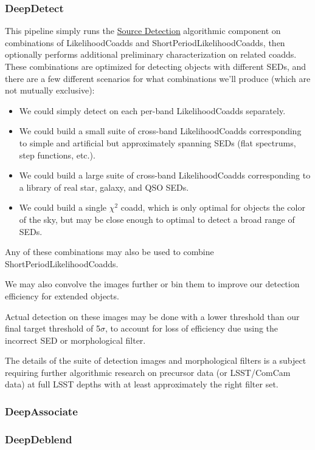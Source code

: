 \subsubsection{DeepDetect}
\label{sec:drpDeepDetect}

This pipeline simply runs the \hyperref[sec:acSourceDetection]{Source Detection} algorithmic component on combinations of LikelihoodCoadds and ShortPeriodLikelihoodCoadds, then optionally performs additional preliminary characterization on related coadds.  These combinations are optimized for detecting objects with different SEDs, and there are a few different scenarios for what combinations we'll produce (which are not mutually exclusive):
\begin{itemize}
\item We could simply detect on each per-band LikelihoodCoadds separately.
\item We could build a small suite of cross-band LikelihoodCoadds corresponding to simple and artificial but approximately spanning SEDs (flat spectrums, step functions, etc.).
\item We could build a large suite of cross-band LikelihoodCoadds corresponding to a library of real star, galaxy, and QSO SEDs.
\item We could build a single $\chi^2$ coadd, which is only optimal for objects the color of the sky, but may be close enough to optimal to detect a broad range of SEDs.
\end{itemize}
Any of these combinations may also be used to combine ShortPeriodLikelihoodCoadds.

We may also convolve the images further or bin them to improve our detection efficiency for extended objects.

Actual detection on these images may be done with a lower threshold than our final target threshold of 5$\sigma$, to account for loss of efficiency due using the incorrect SED or morphological filter.

The details of the suite of detection images and morphological filters is a subject requiring further algorithmic research on precursor data (or LSST/ComCam data) at full LSST depths with at least approximately the right filter set.

\subsubsection{DeepAssociate}
\label{sec:drpDeepAssociate}
\subsubsection{DeepDeblend}
\label{sec:drpDeepDeblend}
